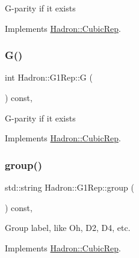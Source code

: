 G-\/parity if it exists 

Implements \mbox{\hyperlink{structHadron_1_1CubicRep_a52104e43266d1614c00bbd1c3b395458}{Hadron\+::\+Cubic\+Rep}}.

\mbox{\label{structHadron_1_1G1Rep_aef0192ff8fe84fbb599253d0b499cc48}} 
\subsubsection{\texorpdfstring{G()}{G()}\hspace{0.1cm}{\footnotesize\ttfamily [2/2]}}
{\footnotesize\ttfamily int Hadron\+::\+G1\+Rep\+::G (\begin{DoxyParamCaption}{ }\end{DoxyParamCaption}) const\hspace{0.3cm}{\ttfamily [inline]}, {\ttfamily [virtual]}}

G-\/parity if it exists 

Implements \mbox{\hyperlink{structHadron_1_1CubicRep_a52104e43266d1614c00bbd1c3b395458}{Hadron\+::\+Cubic\+Rep}}.

\mbox{\label{structHadron_1_1G1Rep_a46fbef350073111e5d5d23ae1dc9832d}} 
\subsubsection{\texorpdfstring{group()}{group()}\hspace{0.1cm}{\footnotesize\ttfamily [1/2]}}
{\footnotesize\ttfamily std\+::string Hadron\+::\+G1\+Rep\+::group (\begin{DoxyParamCaption}{ }\end{DoxyParamCaption}) const\hspace{0.3cm}{\ttfamily [inline]}, {\ttfamily [virtual]}}

Group label, like Oh, D2, D4, etc. 

Implements \mbox{\hyperlink{structHadron_1_1CubicRep_a0748f11ec87f387062c8e8981339a29c}{Hadron\+::\+Cubic\+Rep}}.

\mbox{\label{structHadron_1_1G1Rep_a46fbef350073111e5d5d23ae1dc9832d}} 

